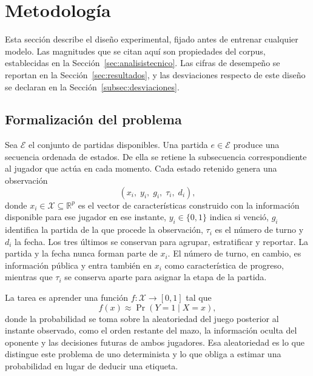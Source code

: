 %
\section{Metodología}
\label{sec:metodologia}

Esta sección describe el diseño experimental, fijado antes de entrenar
cualquier modelo. Las magnitudes que se citan aquí son propiedades del
corpus, establecidas en la Sección~\ref{sec:analisistecnico}. Las cifras de
desempeño se reportan en la Sección~\ref{sec:resultados}, y las desviaciones
respecto de este diseño se declaran en la
Sección~\ref{subsec:desviaciones}.

\subsection{Formalización del problema}
\label{subsec:formalizacion}

Sea $\mathcal{E}$ el conjunto de partidas disponibles. Una partida
$e \in \mathcal{E}$ produce una secuencia ordenada de estados. De ella se
retiene la subsecuencia correspondiente al jugador que actúa en cada
momento. Cada estado retenido genera una observación
\[
  (x_i,\; y_i,\; g_i,\; \tau_i,\; d_i),
\]
donde $x_i \in \mathcal{X} \subseteq \mathbb{R}^p$ es el vector de
características construido con la información disponible para ese jugador en
ese instante, $y_i \in \{0,1\}$ indica si venció, $g_i$ identifica la partida
de la que procede la observación, $\tau_i$ es el número de turno y $d_i$ la
fecha. Los tres últimos se conservan para agrupar, estratificar y reportar.
La partida y la fecha nunca forman parte de $x_i$. El número de turno, en
cambio, es información pública y entra también en $x_i$ como característica
de progreso, mientras que $\tau_i$ se conserva aparte para asignar la etapa
de la partida.

La tarea es aprender una función $f : \mathcal{X} \rightarrow [0,1]$ tal que
\begin{equation}
\label{eq:objetivo}
  f(x) \approx \Pr\!\left(Y = 1 \mid X = x\right),
\end{equation}
donde la probabilidad se toma sobre la aleatoriedad del juego posterior al
instante observado, como el orden restante del mazo, la información oculta del
oponente y las decisiones futuras de ambos jugadores. Esa aleatoriedad es lo
que distingue este problema de uno determinista y lo que obliga a estimar
una probabilidad en lugar de deducir una etiqueta.


